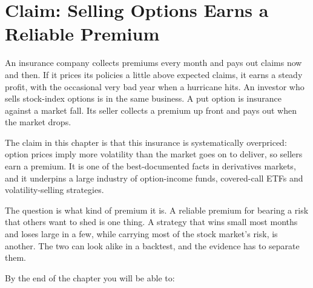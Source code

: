\makeatletter
{}
\makeatother

\chapter{Claim: Selling Options Earns a Reliable Premium}
\label{ch:14}

An insurance company collects premiums every month and pays out claims now and then. If it prices its policies a little above expected claims, it earns a steady profit, with the occasional very bad year when a hurricane hits. An investor who sells stock-index options is in the same business. A put option is insurance against a market fall. Its seller collects a premium up front and pays out when the market drops.

The claim in this chapter is that this insurance is systematically overpriced: option prices imply more volatility than the market goes on to deliver, so sellers earn a premium. It is one of the best-documented facts in derivatives markets, and it underpins a large industry of option-income funds, covered-call ETFs and volatility-selling strategies.

The question is what kind of premium it is. A reliable premium for bearing a risk that others want to shed is one thing. A strategy that wins small most months and loses large in a few, while carrying most of the stock market's risk, is another. The two can look alike in a backtest, and the evidence has to separate them.

By the end of the chapter you will be able to:

